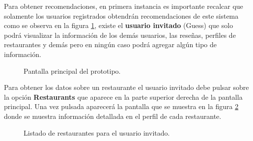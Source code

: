 \documentclass[12pt,letterpaper,oneside] {memoir}
\begin{document}
Para obtener recomendaciones, en primera instancia es importante recalcar que solamente los usuarios registrados obtendrán recomendaciones de este sistema como se observa en la figura \ref{fig:p2}, existe el \textbf{usuario invitado} (Guess) que solo podrá visualizar la información de los demás usuarios, las reseñas, perfiles de restaurantes y demás pero en ningún caso podrá agregar algún tipo de información.\\

\begin{figure}[H]
\centering 
{} \caption{Pantalla principal del prototipo.} 
\label{fig:p2} 
\end{figure}

Para obtener los datos sobre un restaurante el usuario invitado debe pulsar sobre la opción \textbf{Restaurants} que aparece en la parte superior derecha de la pantalla principal. Una vez pulsada aparecerá la pantalla que se muestra en la figura \ref{fig:p3} donde se muestra información detallada en el perfil de cada restaurante.\\

\begin{figure}[H]
\centering 
{} \caption{Listado de restaurantes para el usuario invitado.} 
\label{fig:p3} 
\end{figure}
\end{document}
